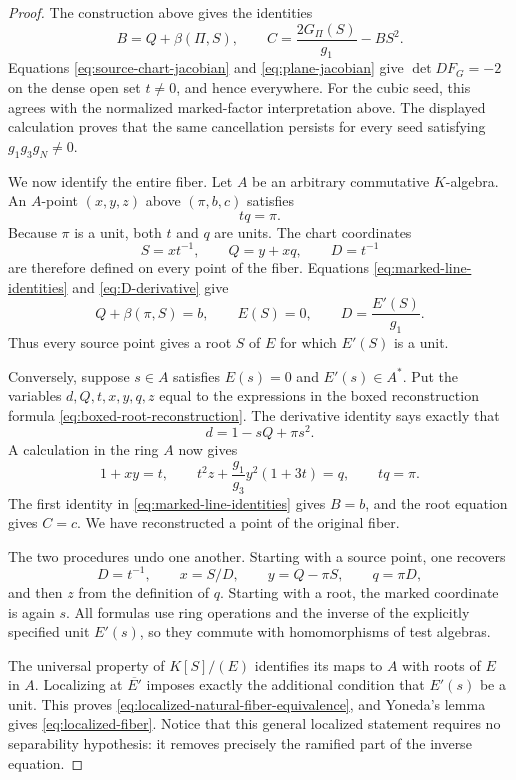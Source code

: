 \begin{proof}
The construction above gives the identities
\begin{equation}
 B=Q+\beta(\Pi,S),
 \qquad
 C=\frac{2G_\Pi(S)}{g_1}-BS^2.
 \label{eq:marked-line-identities}
\end{equation}
Equations \eqref{eq:source-chart-jacobian} and
\eqref{eq:plane-jacobian} give \(\det DF_G=-2\) on the dense open set
\(t\neq0\), and hence everywhere.
For the cubic seed, this agrees with the normalized marked-factor
interpretation above.  The displayed calculation proves that the same
cancellation persists for every seed satisfying \(g_1g_3g_N\neq0\).

We now identify the entire fiber.  Let $A$ be an arbitrary commutative
$K$-algebra.  An $A$-point $(x,y,z)$ above $(\pi,b,c)$ satisfies
\[
 tq=\pi.
\]
Because $\pi$ is a unit, both $t$ and $q$ are units.  The chart coordinates
\[
 S=xt^{-1},
 \qquad Q=y+xq,
 \qquad D=t^{-1}
\]
are therefore defined on every point of the fiber.  Equations
\eqref{eq:marked-line-identities} and \eqref{eq:D-derivative} give
\[
 Q+\beta(\pi,S)=b,
 \qquad E(S)=0,
 \qquad D=\frac{E'(S)}{g_1}.
\]
Thus every source point gives a root $S$ of $E$ for which $E'(S)$ is a unit.

Conversely, suppose $s\in A$ satisfies $E(s)=0$ and $E'(s)\in A^*$.  Put
the variables \(d,Q,t,x,y,q,z\) equal to the expressions in the boxed
reconstruction formula \eqref{eq:boxed-root-reconstruction}.
The derivative identity says exactly that
\[
 d=1-sQ+\pi s^2.
\]
A calculation in the ring $A$ now gives
\[
 1+xy=t,
 \qquad
 t^2z+\frac{g_1}{g_3}y^2(1+3t)=q,
 \qquad tq=\pi.
\]
The first identity in \eqref{eq:marked-line-identities} gives $B=b$, and the
root equation gives $C=c$.  We have reconstructed a point of the original
fiber.

The two procedures undo one another.  Starting with a source point, one
recovers
\[
 D=t^{-1},\qquad x=S/D,\qquad y=Q-\pi S,\qquad q=\pi D,
\]
and then $z$ from the definition of $q$.  Starting with a root, the marked
coordinate is again $s$.  All formulas use ring operations and the inverse of
the explicitly specified unit $E'(s)$, so they commute with homomorphisms of
test algebras.

The universal property of $K[S]/(E)$ identifies its maps to $A$ with roots of
$E$ in $A$.  Localizing at $\overline{E'}$ imposes exactly the additional
condition that $E'(s)$ be a unit.  This proves
\eqref{eq:localized-natural-fiber-equivalence}, and Yoneda's lemma gives
\eqref{eq:localized-fiber}.  Notice that this general localized statement
requires no separability hypothesis: it removes precisely the ramified part
of the inverse equation.


\end{proof}
